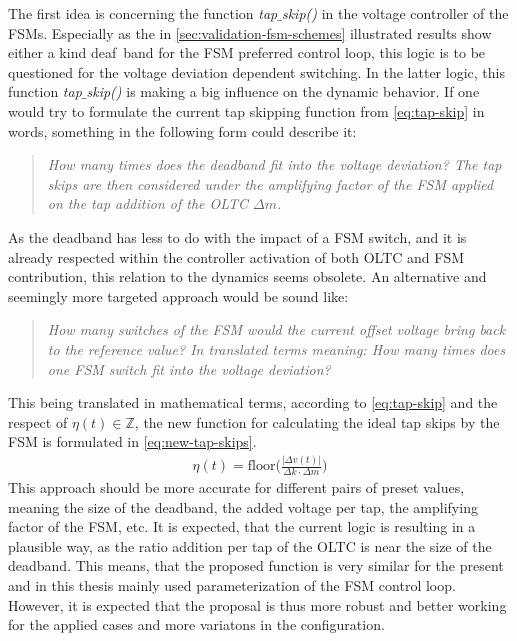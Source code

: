 The first idea is concerning the function \textit{tap$\_$skip()} in the voltage controller of the \acsp{FSM}.
Especially as the in \autoref{sec:validation-fsm-schemes} illustrated results show either a kind \glqq deaf\grqq~band for the \acs{FSM} preferred control loop, this logic is to be questioned for the voltage deviation dependent switching.
In the latter logic, this function \textit{tap$\_$skip()} is making a big influence on the dynamic behavior.
If one would try to formulate the current tap skipping function from \autoref{eq:tap-skip} in words, something in the following form could describe it: 
\begin{quote} \itshape
        How many times does the deadband fit into the voltage deviation? The tap skips are then considered under the amplifying factor of the \acs{FSM} applied on the tap addition of the \acs{OLTC} $\Delta m$.
\end{quote}
As the deadband has less to do with the impact of a \acs{FSM} switch, and it is already respected within the controller activation of both \acs{OLTC} and \acs{FSM} contribution, this relation to the dynamics seems obsolete.
An alternative and seemingly more targeted approach would be sound like: 
\begin{quote} \itshape
        How many switches of the FSM would the current offset voltage bring back to the reference value?
        In translated terms meaning: How many times does one FSM switch fit into the voltage deviation?
\end{quote}
This being translated in mathematical terms, according to \autoref{eq:tap-skip} and the respect of $\eta(t) \in \mathbb{Z}$, the new function for calculating the ideal tap skips by the \acs{FSM} is formulated in \autoref{eq:new-tap-skips}.
\begin{align}
        \eta(t)=\text{floor}\bigg(\frac{\vert \Delta v(t)\vert}{\Delta k \cdot \Delta m}\bigg) \label{eq:new-tap-skips}
\end{align}
This approach should be more accurate for different pairs of preset values, meaning the size of the deadband, the added voltage per tap, the amplifying factor of the \acs{FSM}, etc.
It is expected, that the current logic is resulting in a plausible way, as the ratio addition per tap of the \acs{OLTC} is near the size of the deadband.
This means, that the proposed function is very similar for the present and in this thesis mainly used parameterization of the \acs{FSM} control loop.
However, it is expected that the proposal is thus more robust and better working for the applied cases and more variatons in the configuration.

